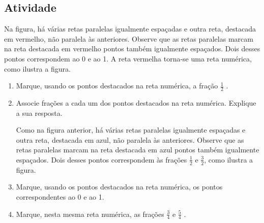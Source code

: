 \subsection{Atividade}

Na figura, há várias retas paralelas igualmente espaçadas e outra reta, destacada em vermelho, não paralela às anteriores. Observe que as retas paralelas marcam na reta destacada em vermelho pontos também igualmente espaçados. Dois desses pontos correspondem ao 0 e ao 1. A reta vermelha torna-se uma reta numérica, como ilustra a figura.

\begin{enumerate} [\quad a)] %
  \item     Marque, usando os pontos destacados na reta numérica, a fração     $\frac{1}{2}$    .
  \item     Associe frações a cada um dos pontos destacados na reta numérica. Explique a sua resposta.    \mbox{} \newline
\begin{center}
\end{center}

Como na figura anterior, há várias retas paralelas igualmente espaçadas e outra reta, destacada em azul, não paralela às anteriores. Observe que as retas paralelas marcam na reta destacada em azul pontos também igualmente espaçados. Dois desses pontos correspondem às frações $\frac{1}{2}$ e $\frac{3}{2}$, como ilustra a figura.

  \item     Marque, usando os pontos destacados na reta numérica, os pontos correspondentes ao 0 e ao 1.
  \item     Marque, nesta mesma reta numérica, as frações     $\frac{3}{4}$     e     $\frac{5}{4}$    .
\begin{center}
  \begin{tikzpicture}[x=56.25mm,y=56.25mm]


\end{tikzpicture}
\end{center}
\end{enumerate}
